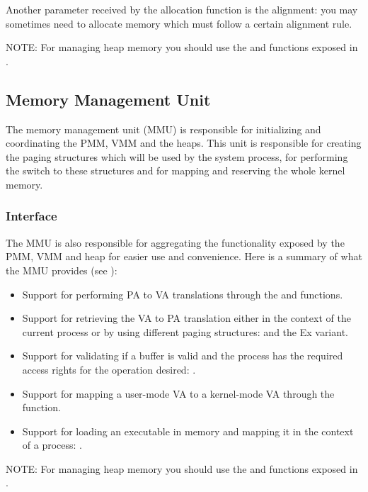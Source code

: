 \begin{appendices}
Another parameter received by the allocation function is the alignment: you may sometimes need to
allocate memory which must follow a certain alignment rule.

NOTE: For managing heap memory you should use the  and 
 functions exposed in .

\subsection{Memory Management Unit}
\label{sect:MMU}

The memory management unit (MMU) is responsible for initializing and coordinating the PMM, VMM and
the heaps. This unit is responsible for creating the paging structures which will be used by the
system process, for performing the switch to these structures and for mapping and reserving the
whole kernel memory.

\subsubsection{Interface}
The MMU is also responsible for aggregating the functionality exposed by the PMM, VMM and heap for
easier use and convenience. Here is a summary of what the MMU provides (see ):
\begin{itemize}
	\item Support for performing PA to VA translations through the  and
 functions.

	\item Support for retrieving the VA to PA translation either in the context of the current
process or by using different paging structures:  and the Ex variant.

	\item Support for validating if a buffer is valid and the process has the required access rights
for the operation desired: .

	\item Support for mapping a user-mode VA to a kernel-mode VA through the 
 function.

	\item Support for loading an executable in memory and mapping it in the context of a process:
.
\end{itemize}

NOTE: For managing heap memory you should use the  and 
 functions exposed in .


\end{appendices}
